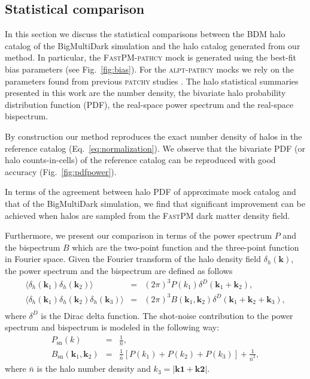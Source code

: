 \documentclass[english,usenatbib]{mn2e}
\newcommand{\ba}{\begin{eqnarray}}
\newcommand{\ea}{\end{eqnarray}}
\begin{document}
\subsection{Statistical comparison}
\label{sec:stats}

In this section we discuss the statistical comparisons between the BDM halo catalog of the BigMultiDark simulation and the halo catalog generated from our method. In particular, the \textsc{FastPM}-\textsc{pathcy} mock is generated using the best-fit bias parameters (see Fig.~\ref{fig:bias}). For the \textsc{alpt}-\textsc{pathcy} mocks we rely on the parameters found from previous \textsc{patchy} studies \citep{kitaura2016}. The halo statistical summaries presented in this work are the number density, the bivariate halo probability distribution function (PDF), the real-space power spectrum and the real-space bispectrum. 

By construction our method reproduces the exact number density of halos in the reference catalog (Eq.~\ref{eq:normalization}). We observe that the bivariate PDF (or halo counts-in-cells) of the reference catalog can be reproduced with good accuracy (Fig.~\ref{fig:pdfpower}). 

In terms of the agreement between halo PDF of approximate mock catalog and that of the BigMultiDark simulation, we find that significant improvement can be achieved when halos are sampled from the \textsc{FastPM} dark matter density field. 

Furthermore, we present our comparison in terms of the power spectrum $P$ and the bispectrum $B$ which are the two-point function and the three-point function in Fourier space. Given the Fourier transform of the halo density field $\delta_{h}(\mathbf{k})$, the power spectrum and the bispectrum are defined as follows
\ba
\langle \delta_{h}(\mathbf{k}_{1}) \delta_{h}(\mathbf{k}_{2})\rangle &=& (2\pi)^{3} P(k_{1}) \delta^{D}(\mathbf{k}_{1}+\mathbf{k}_{2}), \\
\langle \delta_{h}(\mathbf{k}_{1}) \delta_{h}(\mathbf{k}_{2}) \delta_{h}(\mathbf{k}_{3})\rangle &=& (2\pi)^{3} B(\mathbf{k}_{1},\mathbf{k}_{2}) \delta^{D}(\mathbf{k}_{1}+\mathbf{k}_{2}+\mathbf{k}_{3}), \nonumber \\
\ea
where $\delta^{D}$ is the Dirac delta function. The shot-noise contribution to the power spectrum and bispectrum is modeled in the following way:
\ba
P_{\mathrm{sn}}(k) &=& \frac{1}{\bar{n}}, \\
B_{\mathrm{sn}}(\mathbf{k}_{1},\mathbf{k}_{2}) &=& \frac{1}{\bar{n}} [P(k_{1}) + P(k_{2}) + P(k_{3})] + \frac{1}{\bar{n}^{2}},
\ea
where $\bar{n}$ is the halo number density and $k_{3}=|\mathbf{k1}+\mathbf{k2}|$.
\end{document}
